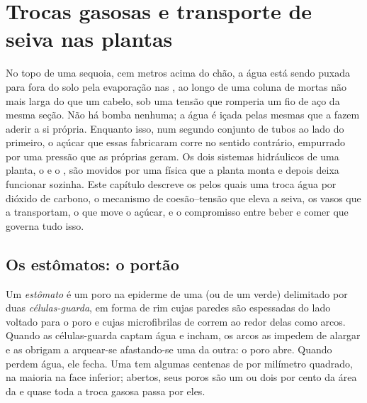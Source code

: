 \chapter{Trocas gasosas e transporte de seiva nas plantas}\label{ch:b1:plant-transport}

No topo de uma sequoia, cem metros acima do chão, a água está sendo
puxada para fora do solo pela evaporação nas , ao longo de uma
coluna de  mortas não mais larga do que um cabelo, sob uma
tensão que romperia um fio de aço da mesma seção. Não há bomba
nenhuma; a água é içada pelas mesmas  que a
fazem aderir a si própria. Enquanto isso, num segundo conjunto de
tubos ao lado do primeiro, o açúcar que essas  fabricaram corre
no sentido contrário, empurrado por uma pressão que as próprias 
geram. Os dois sistemas hidráulicos de uma planta, o  e o
, são movidos por uma física que a planta monta e depois deixa
funcionar sozinha. Este capítulo descreve os  pelos quais uma
 troca água por dióxido de carbono, o mecanismo de coesão--tensão
que eleva a seiva, os vasos que a transportam, o  que move o açúcar, e o compromisso entre beber e comer que
governa tudo isso.

\section{Os estômatos: o portão}

\begin{definition}\label{def:b1:plant-transport:stoma}
Um \emph{estômato} é um poro na epiderme de uma  (ou de um 
verde) delimitado por duas \emph{células-guarda},  em forma de
rim cujas paredes são espessadas do lado voltado para o poro e cujas
microfibrilas de  correm ao redor delas como arcos. Quando as
células-guarda captam água e incham, os arcos as impedem de alargar e
as obrigam a arquear-se afastando-se uma da outra: o poro abre. Quando
perdem água, ele fecha. Uma  tem algumas centenas de 
por milímetro quadrado, na maioria na face inferior; abertos, seus
poros são um ou dois por cento da área da  e quase toda a troca
gasosa passa por eles.
\end{definition}


